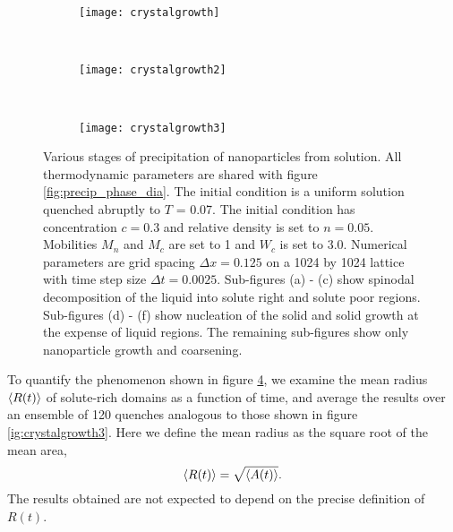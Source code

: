 \begin{figure}
    \vspace{0.25cm}
    \begin{subfigure}[b]{0.3\textwidth}
        \texttt{[image: crystalgrowth]}
        \label{fig:crystalgrowth}
        \caption{}
    \end{subfigure}
    ~
    \begin{subfigure}[b]{0.3\textwidth}
        \texttt{[image: crystalgrowth2]}
        \label{fig:crystalgrowth2}
        \caption{}
    \end{subfigure}
    ~ 
    \begin{subfigure}[b]{0.3\textwidth}
        \texttt{[image: crystalgrowth3]}
        \label{fig:crystalgrowth3}
        \caption{}
    \end{subfigure}
    \caption[Stages of precipitation of nanoparticles from solution]{
        \label{fig:precipitation}
        Various stages of precipitation of nanoparticles from solution. All
        thermodynamic parameters are shared with figure
        \ref{fig:precip_phase_dia}. The initial condition is a uniform solution
        quenched abruptly to $T$ = 0.07. The initial condition has
        concentration $c = 0.3$ and relative density is set to $n = 0.05$. Mobilities
        $M_n$ and $M_c$ are set to 1 and $W_c$ is set to 3.0. Numerical
        parameters are grid spacing $\Delta x = 0.125$ on a 1024 by 1024
        lattice with time step size $\Delta t = 0.0025$. Sub-figures (a) - (c)
        show spinodal decomposition of the liquid into solute right and solute
        poor regions. Sub-figures (d) - (f) show nucleation of the solid and
        solid growth at the expense of liquid regions.  The remaining
        sub-figures show only nanoparticle growth and coarsening.
    }
\end{figure}
%

%
To quantify the phenomenon shown in figure \ref{fig:precipitation}, we examine
the mean radius $\left\langle R(t) \right\rangle$ of solute-rich domains as a function of time, and
average the results over an ensemble of 120 quenches analogous to those shown in 
figure \ref{ig:crystalgrowth3}. Here we define the mean
radius as the square root of the mean area,
%
\begin{equation}
    \left\langle R(t) \right\rangle = \sqrt{\left\langle A(t) \right\rangle}.
\end{equation}
%
The results obtained are not expected to depend on the precise definition of
$R(t)$.

